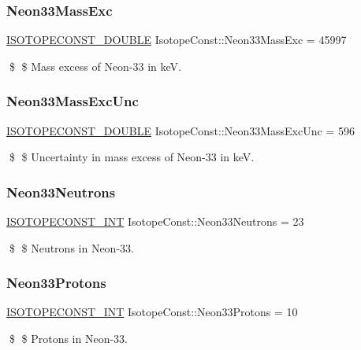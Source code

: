 \subsubsection{\texorpdfstring{Neon33\+Mass\+Exc}{Neon33MassExc}}
{\footnotesize\ttfamily \mbox{\hyperlink{group___isotope_const-_macros_ga8f45a7272ce02c0b4c65c44636ed719a}{I\+S\+O\+T\+O\+P\+E\+C\+O\+N\+S\+T\+\_\+\+D\+O\+U\+B\+LE}} Isotope\+Const\+::\+Neon33\+Mass\+Exc = 45997}

\$ \$ Mass excess of Neon-\/33 in keV. \mbox{\label{group___isotope_const-_neon-_ne33_ga92d7364b4272252796ed4b6d94128129}} 
\subsubsection{\texorpdfstring{Neon33\+Mass\+Exc\+Unc}{Neon33MassExcUnc}}
{\footnotesize\ttfamily \mbox{\hyperlink{group___isotope_const-_macros_ga8f45a7272ce02c0b4c65c44636ed719a}{I\+S\+O\+T\+O\+P\+E\+C\+O\+N\+S\+T\+\_\+\+D\+O\+U\+B\+LE}} Isotope\+Const\+::\+Neon33\+Mass\+Exc\+Unc = 596}

\$ \$ Uncertainty in mass excess of Neon-\/33 in keV. \mbox{\label{group___isotope_const-_neon-_ne33_gaafbc62e2e15d534ffdb24d0a92e7b3b6}} 
\subsubsection{\texorpdfstring{Neon33\+Neutrons}{Neon33Neutrons}}
{\footnotesize\ttfamily \mbox{\hyperlink{group___isotope_const-_macros_ga5f18360b3e99483a35c32d789e62621c}{I\+S\+O\+T\+O\+P\+E\+C\+O\+N\+S\+T\+\_\+\+I\+NT}} Isotope\+Const\+::\+Neon33\+Neutrons = 23}

\$ \$ Neutrons in Neon-\/33. \mbox{\label{group___isotope_const-_neon-_ne33_ga86a8d0c919ff1e6dee6f1a3b2af30a24}} 
\subsubsection{\texorpdfstring{Neon33\+Protons}{Neon33Protons}}
{\footnotesize\ttfamily \mbox{\hyperlink{group___isotope_const-_macros_ga5f18360b3e99483a35c32d789e62621c}{I\+S\+O\+T\+O\+P\+E\+C\+O\+N\+S\+T\+\_\+\+I\+NT}} Isotope\+Const\+::\+Neon33\+Protons = 10}

\$ \$ Protons in Neon-\/33. 